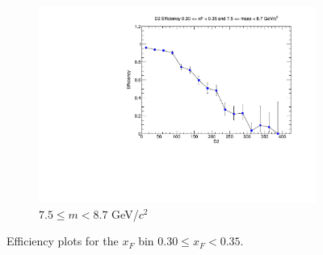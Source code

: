 \begin{figure}[p]
\begin{subfigure}[b]{0.32\textwidth}
        \includegraphics[width=\textwidth]{./kTrackerEfficiencyPlots/D2_Efficiency_xF6_mass10.pdf}
        \caption{$7.5 \leq m < 8.7$ GeV/$c^2$}
        \label{fig:xF6_mass10}
    \end{subfigure}
    \hfill
    \caption{Efficiency plots for the $x_F$ bin $0.30 \leq x_F < 0.35$.}
    \label{fig:xF6}
\end{figure}

\clearpage

